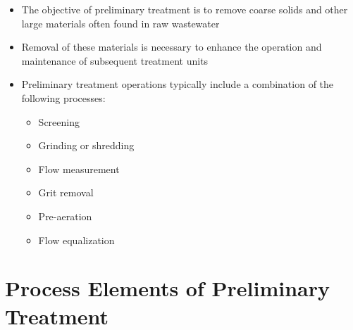 





			\begin{itemize}
				\item The objective of preliminary treatment is to remove coarse solids and other large materials often found in raw wastewater
				\item Removal of these materials is necessary to enhance the operation and maintenance of subsequent treatment units\\
				\item Preliminary treatment operations typically include a combination of the following processes:
					\begin{itemize}
						\item Screening
						\item Grinding or shredding
						\item Flow measurement
						\item Grit removal
						\item Pre-aeration
						\item Flow equalization
					\end{itemize}
			\end{itemize}

				
		\section{Process Elements of Preliminary Treatment}	
			
